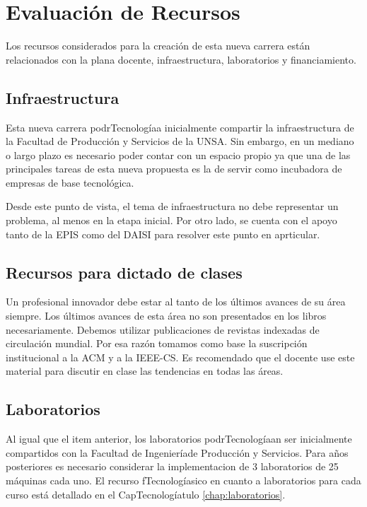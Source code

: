 \chapter{Evaluación de Recursos}\label{chap:cs-resources}

Los recursos considerados para la creación de esta nueva carrera están relacionados con la plana docente, infraestructura, laboratorios y financiamiento.

\OnlyUNSA{}

\section{Infraestructura}\label{sec:cs-infraestructura}
Esta nueva carrera podrTecnologíaa inicialmente compartir la infraestructura de la Facultad de Producción y Servicios de la UNSA. Sin embargo, en un mediano o largo plazo es necesario poder contar con un espacio propio ya que una de las principales tareas de esta nueva propuesta es la de servir como incubadora de empresas de base tecnológica. 

Desde este punto de vista, el tema de infraestructura no debe representar un problema, al menos en la etapa inicial.
Por otro lado, se cuenta con el apoyo tanto de la EPIS como del DAISI para resolver este punto en aprticular.

\section{Recursos para dictado de clases}
Un profesional innovador debe estar al tanto de los últimos avances de su área siempre. Los últimos avances de esta área no son presentados en los libros necesariamente. Debemos utilizar publicaciones de revistas indexadas de circulación mundial. Por esa razón tomamos como base la suscripción institucional a la ACM y a la IEEE-CS. Es recomendado que el docente use este material para discutir en clase las tendencias en todas las áreas.

\section{Laboratorios}\label{sec:cs-labs}
Al igual que el item anterior, los laboratorios podrTecnologíaan ser inicialmente compartidos con la Facultad de Ingenieríade Producción y Servicios. Para años posteriores es necesario considerar la implementacion de 3 laboratorios de 25 máquinas cada uno. El recurso fTecnologíasico en cuanto a laboratorios para cada curso está detallado en el CapTecnologíatulo \ref{chap:laboratorios}.

